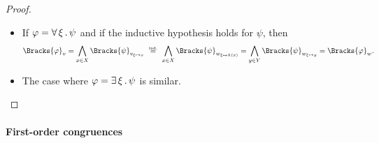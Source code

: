 \begin{proof}
\begin{itemize}
    \item If \( \varphi = \forall \thinspace \xi \thinspace . \thinspace \psi \) and if the inductive hypothesis holds for \( \psi \), then
    \begin{equation*}
      \Bracks{\varphi}_v
      =
      \bigwedge_{x \in X} \Bracks{\psi}_{v_{\xi \mapsto x}}
      \reloset {\T{ind.}} =
      \bigwedge_{x \in X} \Bracks{\psi}_{w_{\xi \mapsto h(x)}}
      =
      \bigwedge_{y \in Y} \Bracks{\psi}_{w_{\xi \mapsto y}}
      =
      \Bracks{\varphi}_w.
    \end{equation*}

    \item The case where \( \varphi = \exists \thinspace \xi \thinspace . \thinspace \psi \) is similar.
  \end{itemize}
\end{proof}

\paragraph{First-order congruences}

